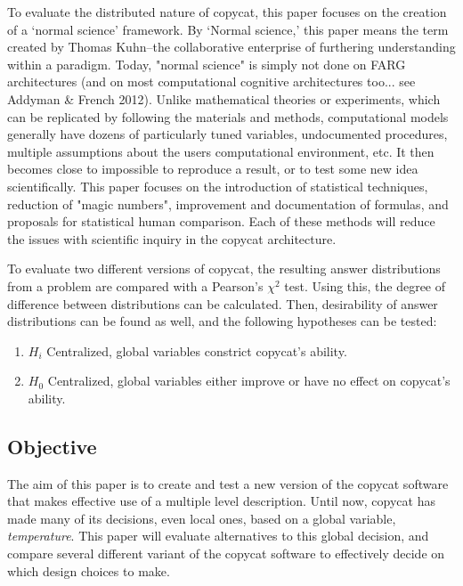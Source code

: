 \documentclass[a4paper]{article}
\begin{document}
To evaluate the distributed nature of copycat, this paper focuses on the creation of a `normal science' framework.
By `Normal science,' this paper means the term created by Thomas Kuhn--the collaborative enterprise of furthering understanding within a paradigm. 
Today, "normal science" is simply not done on FARG architectures (and on most computational cognitive architectures too... see Addyman \& French 2012). 
Unlike mathematical theories or experiments, which can be replicated by following the materials and methods, computational models generally have dozens of particularly tuned variables, undocumented procedures, multiple assumptions about the users computational environment, etc.
It then becomes close to impossible to reproduce a result, or to test some new idea scientifically. 
This paper focuses on the introduction of statistical techniques, reduction of "magic numbers", improvement and documentation of formulas, and proposals for statistical human comparison.
Each of these methods will reduce the issues with scientific inquiry in the copycat architecture.

To evaluate two different versions of copycat, the resulting answer distributions from a problem are compared with a Pearson's $\chi^2$ test.
Using this, the degree of difference between distributions can be calculated.
Then, desirability of answer distributions can be found as well, and the following hypotheses can be tested:

\begin{enumerate}
    \item $H_i$ Centralized, global variables constrict copycat's ability.
    \item $H_0$ Centralized, global variables either improve or have no effect on copycat's ability.
\end{enumerate}

\subsection{Objective}

    The aim of this paper is to create and test a new version of the copycat software that makes effective use of a multiple level description.
    Until now, copycat has made many of its decisions, even local ones, based on a global variable, \emph{temperature}.
    This paper will evaluate alternatives to this global decision, and compare several different variant of the copycat software to effectively decide on which design choices to make.
\end{document}
